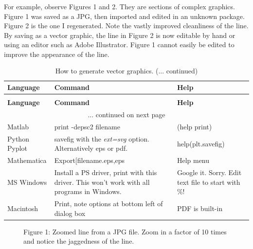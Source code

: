 \documentclass[a4paper]{article}
\newlength{\DUtablewidth} %
\begin{document}
For example, observe Figures 1 and 2. They are
sections of complex graphics. Figure 1 was saved as a JPG,
then imported and edited in an unknown package. Figure 2 is
the one I regenerated. Note the vastly improved cleanliness of the line.
By saving as a vector graphic, the line in  Figure 2 is now
editable by hand or using an editor such as Adobe Illustrator. Figure
1 cannot easily be edited to improve the
appearance of the line.

\setlength{\DUtablewidth}{\linewidth}
\begin{longtable}[c]{|p{0.179\DUtablewidth}|p{0.342\DUtablewidth}|p{0.226\DUtablewidth}|}
\caption{How to generate vector graphics.}\\
\hline
\textbf{%
Language
} & \textbf{%
Command
} & \textbf{%
Help
} \\
\hline
\endfirsthead
\caption[]{How to generate vector graphics. (... continued)}\\
\hline
\textbf{%
Language
} & \textbf{%
Command
} & \textbf{%
Help
} \\
\hline
\endhead
\multicolumn{3}{c}{\hfill ... continued on next page} \\
\endfoot
\endlastfoot

Matlab
 & 
print -depsc2 filename
 & 
(help print)
 \\
\hline

Python Pyplot
 & 
savefig with the \emph{ext=\textquotedbl{}svg\textquotedbl{}}
option. Alternatively eps or
pdf.
 & 
help(plt.savefig)
 \\
\hline

Mathematica
 & 
Export{[}\textquotedbl{}filename.eps\textquotedbl{},\textquotedbl{}eps\textquotedbl{}{]}
 & 
Help menu
 \\
\hline

MS Windows
 & 
Install a PS driver, print
with this driver. This won't
work with all programs in
Windows.
 & 
Google it.
Sorry. Edit
text file to
start with \%!
 \\
\hline

Macintosh
 & 
Print, note options at
bottom left of dialog box
 & 
PDF is
built-in
 \\
\hline
\end{longtable}
\label{table}

\begin{figure}
\label{figure1}
\noindent{}
\caption{Figure 1: Zoomed line from a JPG file. Zoom in a factor of 10 times and
notice the jaggedness of the line.}
\end{figure}
\end{document}
